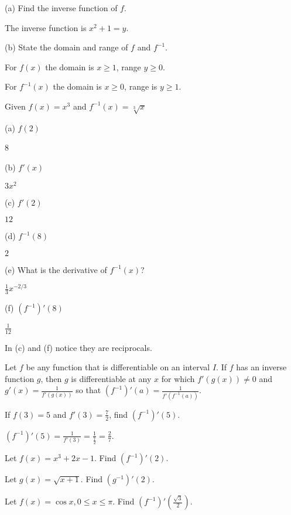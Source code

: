 \documentclass[../bccalc.tex]{subfiles}
\begin{document}
\begin{example}
    (a) Find the inverse function of $f$.

    The inverse function is $x^2+1=y$.

    (b) State the domain and range of $f$ and $f^{-1}$.

    For $f(x)$ the domain is $x\geq 1$, range $y\geq 0$.

    For $f^{-1}(x)$ the domain is $x\geq 0$, range is $y\geq 1$.
\end{example}
\pagebreak
\begin{example}
    Given $f(x)=x^3$ and $f^{-1}(x)=\sqrt[3]{x}$

    (a) $f(2)$

    8

    (b) $f'(x)$

    $3x^2$

    (c) $f'(2)$

    $12$

    (d) $f^{-1}(8)$

    $2$

    (e) What is the derivative of $f^{-1}(x)$?

    $\frac{1}{3}x^{-2/3}$

    (f) $(f^{-1})'(8)$

    $\frac{1}{12}$
\end{example}

In (c) and (f) notice they are reciprocals.

\begin{theorem}
    Let $f$ be any function that is differentiable on an interval $I$. If $f$ has an inverse function $g$, then $g$ is differentiable at any $x$
    for which $f'(g(x))\neq 0$ and $g'(x)=\frac{1}{f'(g(x))}$ so that $(f^{-1})'(a)=\frac{1}{f'(f^{-1}(a))}$.
\end{theorem}

\begin{example}
    If $f(3)=5$ and $f'(3)=\frac{7}{2}$, find $(f^{-1})'(5)$.

    $(f^{-1})'(5)=\frac{1}{f'(3)}=\frac{1}{\frac{7}{2}}=\frac{2}{7}$.
\end{example}

\ex Let $f(x)=x^3+2x-1$. Find $(f^{-1})'(2)$.

\ex Let $g(x)=\sqrt{x+1}$. Find $(g^{-1})'(2)$.

\ex Let $f(x)=\cos x, 0\leq x\leq \pi$. Find $(f^{-1})'\left(\frac{\sqrt{3}}{2}\right)$.
\end{document}
